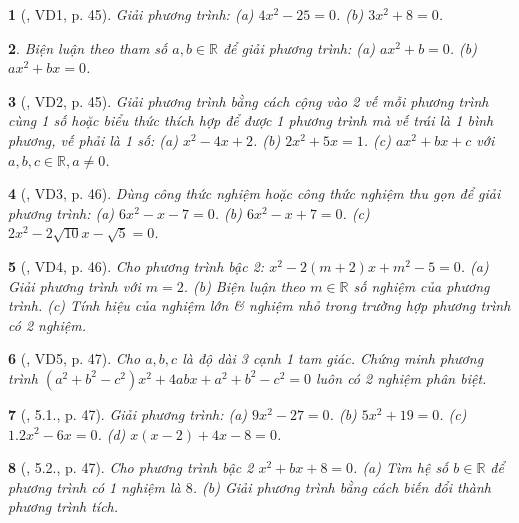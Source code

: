 \documentclass{article}
\newtheorem{baitoan}{}
\begin{document}
\begin{baitoan}[\cite{Binh_boi_duong_Toan_9_tap_2}, VD1, p. 45]
	Giải phương trình: (a) $4x^2 - 25 = 0$. (b) $3x^2 + 8 = 0$.
\end{baitoan}

\begin{baitoan}
	Biện luận theo tham số $a,b\in\mathbb{R}$ để giải phương trình: (a) $ax^2 + b = 0$. (b) $ax^2 + bx = 0$.
\end{baitoan}

\begin{baitoan}[\cite{Binh_boi_duong_Toan_9_tap_2}, VD2, p. 45]
	Giải phương trình bằng cách cộng vào 2 vế mỗi phương trình cùng 1 số hoặc biểu thức thích hợp để được 1 phương trình mà vế trái là 1 bình phương, vế phải là 1 số: (a) $x^2 - 4x + 2$. (b) $2x^2 + 5x = 1$. (c) $ax^2 + bx + c$ với $a,b,c\in\mathbb{R},a\ne0$.
\end{baitoan}

\begin{baitoan}[\cite{Binh_boi_duong_Toan_9_tap_2}, VD3, p. 46]
	Dùng công thức nghiệm hoặc công thức nghiệm thu gọn để giải phương trình: (a) $6x^2 - x - 7 = 0$. (b) $6x^2 - x + 7 = 0$. (c) $2x^2 - 2\sqrt{10}x - \sqrt{5} = 0$.
\end{baitoan}

\begin{baitoan}[\cite{Binh_boi_duong_Toan_9_tap_2}, VD4, p. 46]
	Cho phương trình bậc 2: $x^2 - 2(m + 2)x + m^2 - 5 = 0$. (a) Giải phương trình với $m = 2$. (b) Biện luận theo $m\in\mathbb{R}$ số nghiệm của phương trình. (c) Tính hiệu của nghiệm lớn \& nghiệm nhỏ trong trường hợp phương trình có 2 nghiệm.
\end{baitoan}

\begin{baitoan}[\cite{Binh_boi_duong_Toan_9_tap_2}, VD5, p. 47]
	Cho $a,b,c$ là độ dài 3 cạnh 1 tam giác. Chứng minh phương trình $(a^2 + b^2 - c^2)x^2 + 4abx + a^2 + b^2 - c^2 = 0$ luôn có 2 nghiệm phân biệt.
\end{baitoan}

\begin{baitoan}[\cite{Binh_boi_duong_Toan_9_tap_2}, 5.1., p. 47]
	Giải phương trình: (a) $9x^2 - 27 = 0$. (b) $5x^2 + 19 = 0$. (c) $1.2x^2 - 6x = 0$. (d) $x(x - 2) + 4x - 8 = 0$.
\end{baitoan}

\begin{baitoan}[\cite{Binh_boi_duong_Toan_9_tap_2}, 5.2., p. 47]
	Cho phương trình bậc 2 $x^2 + bx + 8 = 0$. (a) Tìm hệ số $b\in\mathbb{R}$ để phương trình có 1 nghiệm là $8$. (b) Giải phương trình bằng cách biến đổi thành phương trình tích.
\end{baitoan}
\end{document}
